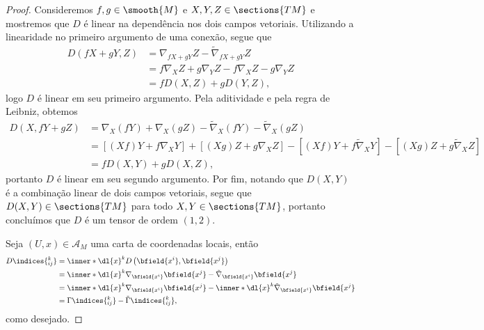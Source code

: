 \documentclass[portuguese]{artigo}
\begin{document}
    \begin{proof}
        Consideremos \(f,g\in\smooth{M}\) e \(X,Y,Z \in\sections{TM}\) e mostremos que \(D\) é linear na dependência nos dois campos vetoriais. Utilizando a linearidade no primeiro argumento de uma conexão, segue que
        \begin{align*}
            D(fX + gY, Z) &= \nabla_{fX + gY}Z - \tilde{\nabla}_{fX + gY}Z\\
                          &= f \nabla_X Z + g\nabla_Y Z - f\nabla_X Z - g\nabla_Y Z\\
                          &= f D(X,Z) + g D(Y,Z),
        \end{align*}
        logo \(D\) é linear em seu primeiro argumento. Pela aditividade e pela regra de Leibniz, obtemos
        \begin{align*}
            D(X, fY + gZ) &= \nabla_X (fY) + \nabla_X (gZ) - \tilde{\nabla}_X (fY) - \tilde{\nabla}_X (gZ)\\
                          &= \left[(Xf)Y + f\nabla_X Y\right] + \left[(Xg)Z + g\nabla_X Z\right] - \left[(Xf)Y + f\tilde{\nabla}_X Y\right] - \left[(Xg)Z + g\tilde{\nabla}_X Z\right]\\
                          &=  fD(X,Y) + gD(X,Z),
        \end{align*}
        portanto \(D\) é linear em seu segundo argumento. Por fim, notando que \(D(X,Y)\) é a combinação linear de dois campos vetoriais, segue que \(D(X,Y) \in \sections{TM}\) para todo \(X,Y\in \sections{TM}\), portanto concluímos que \(D\) é um tensor de ordem \((1,2)\).

        Seja \((U, x) \in \mathscr{A}_M\) uma carta de coordenadas locais, então
        \begin{align*}
            D\indices{^k_{ij}} &= \inner*{\dl{x}^k}{D\left(\bfield{x^i}, \bfield{x^j}\right)}\\
                               &= \inner*{\dl{x}^k}{\nabla_{\bfield{x^i}}\bfield{x^j} - \tilde{\nabla}_{\bfield{x^i}}\bfield{x^j}}\\
                               &= \inner*{\dl{x}^k}{\nabla_{\bfield{x^i}}\bfield{x^j}} - \inner*{\dl{x}^k}{\tilde{\nabla}_{\bfield{x^i}}\bfield{x^j}}\\
                               &= \Gamma\indices{^k_{ij}} - \tilde{\Gamma}\indices{^k_{ij}},
        \end{align*}
        como desejado.
\end{proof}
\end{document}
